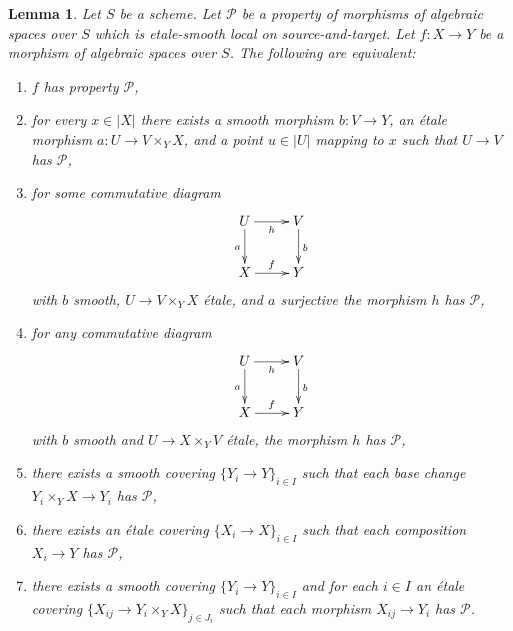 \documentclass[10pt,a4paper]{amsart}
\theoremstyle{plain}
\newtheorem{lemma}[subsection]{Lemma}
\theoremstyle{definition}
\theoremstyle{remark}
\numberwithin{equation}{subsection}
\begin{document}
\begin{lemma}
\label{lemma-etale-smooth-local-source-target-characterize}
Let $S$ be a scheme.
Let $\mathcal{P}$ be a property of morphisms of algebraic spaces over $S$
which is etale-smooth local on source-and-target.
Let $f : X \to Y$ be a morphism
of algebraic spaces over $S$. The following are equivalent:
\begin{enumerate}
\item[(a)] $f$ has property $\mathcal{P}$,
\item[(b)] for every $x \in |X|$ there exists a smooth morphism $b : V \to Y$,
an \'etale morphism $a : U \to V \times_Y X$, and a point $u \in |U|$
mapping to $x$ such that $U \to V$ has $\mathcal{P}$,
\item[(c)] for some commutative diagram
$$
\xymatrix{
U \ar[d]_a \ar[r]_h & V \ar[d]^b \\
X \ar[r]^f & Y
}
$$
with $b$ smooth, $U \to V \times_Y X$ \'etale, and $a$ surjective
the morphism $h$ has $\mathcal{P}$,
\item[(d)] for any commutative diagram
$$
\xymatrix{
U \ar[d]_a \ar[r]_h & V \ar[d]^b \\
X \ar[r]^f & Y
}
$$
with $b$ smooth and $U \to X \times_Y V$ \'etale, the morphism $h$
has $\mathcal{P}$,
\item[(e)] there exists a smooth covering $\{Y_i \to Y\}_{i \in I}$ such
that each base change $Y_i \times_Y X \to Y_i$ has $\mathcal{P}$,
\item[(f)] there exists an \'etale covering $\{X_i \to X\}_{i \in I}$ such
that each composition $X_i \to Y$ has $\mathcal{P}$,
\item[(g)] there exists a smooth covering $\{Y_i \to Y\}_{i \in I}$ and
for each $i \in I$ an \'etale covering
$\{X_{ij} \to Y_i \times_Y X\}_{j \in J_i}$ such that each morphism
$X_{ij} \to Y_i$ has $\mathcal{P}$.
\end{enumerate}
\end{lemma}
\end{document}
